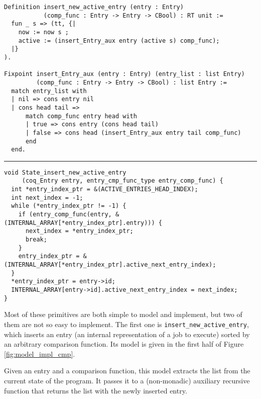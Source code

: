 	\begin{figure*}[!ht]
	    \centering
	    \begin{verbatim}
Definition insert_new_active_entry (entry : Entry)
           (comp_func : Entry -> Entry -> CBool) : RT unit :=
  fun _ s => (tt, {|
    now := now s ;
    active := (insert_Entry_aux entry (active s) comp_func);
  |}
).

Fixpoint insert_Entry_aux (entry : Entry) (entry_list : list Entry)
         (comp_func : Entry -> Entry -> CBool) : list Entry :=
  match entry_list with
  | nil => cons entry nil
  | cons head tail =>
      match comp_func entry head with
      | true => cons entry (cons head tail)
      | false => cons head (insert_Entry_aux entry tail comp_func)
      end
  end.
	    \end{verbatim}
	    \vspace{0.2cm}
	    \hrule
	    \vspace{0.2cm}
	    \begin{verbatim}
void State_insert_new_active_entry
     (coq_Entry entry, entry_cmp_func_type entry_comp_func) {
  int *entry_index_ptr = &(ACTIVE_ENTRIES_HEAD_INDEX);
  int next_index = -1;
  while (*entry_index_ptr != -1) {
    if (entry_comp_func(entry, &(INTERNAL_ARRAY[*entry_index_ptr].entry))) {
      next_index = *entry_index_ptr;
      break;
    }
    entry_index_ptr = &(INTERNAL_ARRAY[*entry_index_ptr].active_next_entry_index);
  }
  *entry_index_ptr = entry->id;
  INTERNAL_ARRAY[entry->id].active_next_entry_index = next_index;
}
	    \end{verbatim}
	    \caption{Side by side comparison between the model of a sorted list insertion primitive and its actual implementation}
	    \label{fig:model_impl_cmp}
	\end{figure*}

	Most of these primitives are both simple to model and implement, but two of them are not so easy to implement. The first one is \texttt{insert\_new\_active\_entry}, which inserts an entry (an internal representation of a job to execute) sorted by an arbitrary comparison function. Its model is given in the first half of Figure \ref{fig:model_impl_cmp}.

	Given an entry and a comparison function, this model extracts the list from the current state of the program. It passes it to a (non-monadic) auxiliary recursive function that returns the list with the newly inserted entry.

